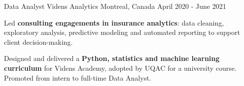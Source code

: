 \begin{cventries}
  \cventry
    {Data Analyst}
    {Videns Analytics}
    {Montreal, Canada}
    {April 2020 - June 2021}
    {
      \begin{cvitems}
        \item{Led \textbf{consulting engagements in insurance analytics}: data cleaning, exploratory analysis, predictive modeling and automated reporting to support client decision-making.}
        \item{Designed and delivered a \textbf{Python, statistics and machine learning curriculum} for Videns Academy, adopted by UQAC for a university course. Promoted from intern to full-time Data Analyst.}
      \end{cvitems}
    }
\end{cventries}
